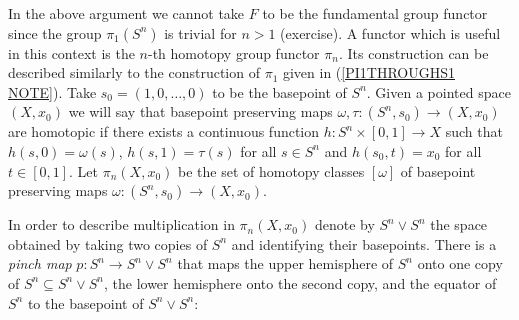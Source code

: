 \documentclass[11pt, letterpaper, oneside]{report}
\theoremstyle{pplain}
\theoremstyle{ddefinition}
\theoremstyle{nnn}
\theoremstyle{eexercise}
\begin{document}
In the above argument we cannot take $F$ to be the fundamental group functor since the group $\pi_{1}(S^{n})$ 
is trivial for  $n>1$ (exercise). A functor which is useful in 
this context is the $n$-th homotopy group functor $\pi_{n}$. Its construction can be described similarly to the 
construction of $\pi_{1}$ given in (\ref{PI1THROUGHS1 NOTE}). Take $s_{0} = (1, 0, \dots, 0)$ to be the basepoint 
of $S^{n}$. Given a pointed space $(X, x_{0})$ we will say that basepoint preserving maps 
$\omega, \tau \colon (S^{n}, s_{0}) \to (X, x_{0})$ are homotopic if there exists 
a continuous function $h\colon S^{n}\times [0, 1]\to X$ such that $h(s, 0) = \omega(s)$, $h(s, 1) = \tau(s)$ for all 
$s\in S^{n}$ and $h(s_{0}, t) = x_{0}$ for all $t\in [0, 1]$. Let  $\pi_{n}(X, x_{0})$ be the set of homotopy classes 
$[\omega]$ of basepoint preserving maps $\omega \colon (S^{n}, s_{0}) \to (X, x_{0})$.

In order to describe multiplication 
in $\pi_{n}(X, x_{0})$ denote by $S^{n}\vee S^{n}$ the space obtained by taking two copies of $S^{n}$ and 
identifying their basepoints.  There is a \emph{pinch map} $p\colon S^{n}\to S^{n}\vee S^{n}$ that maps the upper hemisphere of $S^{n}$ onto one copy of $S^{n} \subseteq S^{n}\vee S^{n}$, the lower hemisphere onto the second copy, and the equator of $S^{n}$ to the basepoint of $S^{n}\vee S^{n}$:
\end{document}
